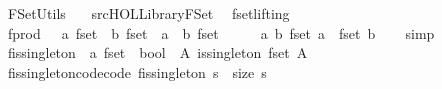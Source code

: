 %
\begin{isabellebody}%
%
%
\isadelimtheory
%
\endisadelimtheory
%
\isatagtheory
{}\isamarkupfalse%
\ FSet{\isacharunderscore}Utils\isanewline
\ \ \ {\isachardoublequoteopen}{\isachartilde}{\isachartilde}{\isacharslash}src{\isacharslash}HOL{\isacharslash}Library{\isacharslash}FSet{\isachardoublequoteclose}\isanewline
{}%
\endisatagtheory
{\isafoldtheory}%
%
\isadelimtheory
\isanewline
%
\endisadelimtheory
\isanewline
{}\isamarkupfalse%
\ \ fset{\isachardot}lifting\ \isanewline
{}\isamarkupfalse%
\ fprod\ \ {\isacharcolon}{\isacharcolon}\ {\isachardoublequoteopen}{\isacharprime}a\ fset\ {\isasymRightarrow}\ {\isacharprime}b\ fset\ {\isasymRightarrow}\ {\isacharparenleft}{\isacharprime}a\ {\isasymtimes}\ {\isacharprime}b{\isacharparenright}\ fset\ {\isachardoublequoteclose}\ {\isacharparenleft}\ {\isachardoublequoteopen}{\isacharbar}{\isasymtimes}{\isacharbar}{\isachardoublequoteclose}\ {}{}{\isacharparenright}\ \ {\isachardoublequoteopen}{\isasymlambda}a\ b{\isachardot}\ fset\ a\ {\isasymtimes}\ fset\ b{\isachardoublequoteclose}\isanewline
%
\isadelimproof
\ \ %
\endisadelimproof
%
\isatagproof
{}\isamarkupfalse%
\ simp%
\endisatagproof
{\isafoldproof}%
%
\isadelimproof
\isanewline
%
\endisadelimproof
\isanewline
{}\isamarkupfalse%
\ fis{\isacharunderscore}singleton\ {\isacharcolon}{\isacharcolon}\ {\isachardoublequoteopen}{\isacharprime}a\ fset\ {\isasymRightarrow}\ bool{\isachardoublequoteclose}\ \ {\isachardoublequoteopen}{\isasymlambda}A{\isachardot}\ is{\isacharunderscore}singleton\ {\isacharparenleft}fset\ A{\isacharparenright}{\isachardoublequoteclose}%
\isadelimproof
%
\endisadelimproof
%
\isatagproof
\isacommand{{\isachardot}}\isamarkupfalse%
%
\endisatagproof
{\isafoldproof}%
%
\isadelimproof
%
\endisadelimproof
\isanewline
{}\isamarkupfalse%
\isanewline
\isanewline
{}\isamarkupfalse%
\ fis{\isacharunderscore}singleton{\isacharunderscore}code{\isacharbrackleft}code{\isacharbrackright}{\isacharcolon}\ {\isachardoublequoteopen}fis{\isacharunderscore}singleton\ s\ {\isacharequal}\ {\isacharparenleft}size\ s\ {\isacharequal}\ {}{\isacharparenright}{\isachardoublequoteclose}\isanewline
%
\isadelimproof
\ \ %
\endisadelimproof
%
\isatagproof

\end{isabellebody}
